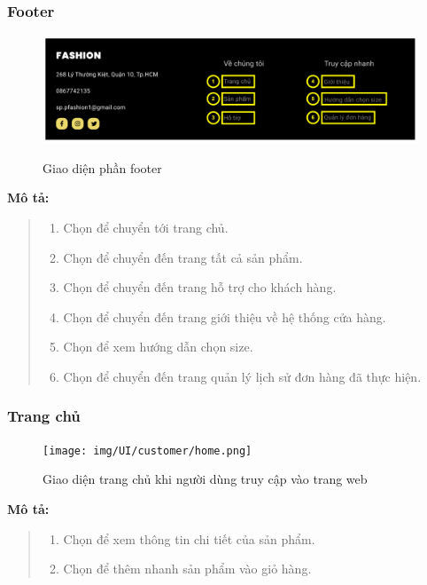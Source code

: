     \subsubsection{Footer}
    \begin{figure}[!htp]
        \centering
        \includegraphics[width=5in]{img/UI/customer/footer.png}
        \label{7}
        \newline
        \caption{Giao diện phần footer}
    \end{figure}
    \textbf{Mô tả:}  
    \begin{quote}
        \begin{enumerate}
            \item Chọn để chuyển tới trang chủ.
            \item Chọn để chuyển đến trang tất cả sản phẩm.
            \item Chọn để chuyển đến trang hỗ trợ cho khách hàng.
            \item Chọn để chuyển đến trang giới thiệu về hệ thống cửa hàng.
            \item Chọn để xem hướng dẫn chọn size.
            \item Chọn để chuyển đến trang quản lý lịch sử đơn hàng đã thực hiện.
        \end{enumerate}
    \end{quote}
   
    \newpage
    \subsubsection{Trang chủ}
    \begin{figure}[!htp]
        \centering
        \texttt{[image: img/UI/customer/home.png]}
        \label{8}
        \newline
        \caption{Giao diện trang chủ khi người dùng truy cập vào trang web}
    \end{figure}
    \textbf{Mô tả:}  
    \begin{quote}
        \begin{enumerate}
            \item Chọn để xem thông tin chi tiết của sản phẩm.
            \item Chọn để thêm nhanh sản phẩm vào giỏ hàng.
        \end{enumerate}
    \end{quote}    
   
